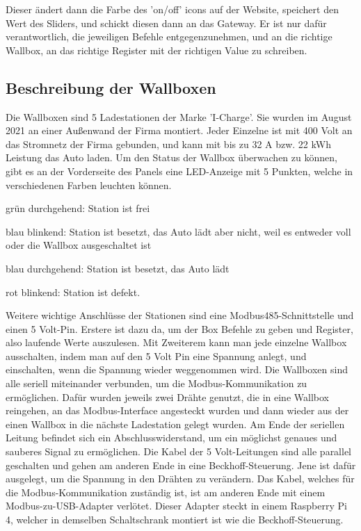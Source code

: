 Dieser ändert dann die Farbe des 'on/off' icons auf der Website, speichert den Wert des Sliders, und schickt diesen dann an das Gateway. Er ist nur dafür verantwortlich, die jeweiligen Befehle entgegenzunehmen, und an die richtige Wallbox, an das richtige Register mit der richtigen Value zu schreiben.





\subsection{Beschreibung der Wallboxen} 

Die Wallboxen sind 5 Ladestationen der Marke 'I-Charge'. Sie wurden im August 2021 an einer Außenwand der Firma montiert. Jeder Einzelne ist mit 400 Volt an das Stromnetz der Firma gebunden, und kann mit bis zu 32 A bzw. 22 kWh Leistung das Auto laden. Um den Status der Wallbox überwachen zu können, gibt es an der Vorderseite des Panels eine LED-Anzeige mit 5 Punkten, welche in verschiedenen Farben leuchten können.

\begin{compactitem}
  \item grün durchgehend: Station ist frei
  \item blau blinkend: Station ist besetzt, das Auto lädt aber nicht, weil es entweder voll oder die Wallbox ausgeschaltet ist
  \item blau durchgehend: Station ist besetzt, das Auto lädt
  \item rot blinkend: Station ist defekt.

\end{compactitem}

Weitere wichtige Anschlüsse der Stationen sind eine Modbus485-Schnittstelle und einen 5 Volt-Pin.
Erstere ist dazu da, um der Box Befehle zu geben und Register, also laufende Werte auszulesen. Mit Zweiterem kann man jede einzelne Wallbox ausschalten, indem man auf den 5 Volt Pin eine Spannung anlegt, und einschalten, wenn die Spannung wieder weggenommen wird.
Die Wallboxen sind alle seriell miteinander verbunden, um die Modbus-Kommunikation zu ermöglichen. Dafür wurden jeweils zwei Drähte genutzt, die in eine Wallbox reingehen, an das Modbus-Interface angesteckt wurden und dann wieder aus der einen Wallbox in die nächste Ladestation gelegt wurden. Am Ende der seriellen Leitung befindet sich ein Abschlusswiderstand, um ein möglichst genaues und sauberes Signal zu ermöglichen. Die Kabel der 5 Volt-Leitungen sind alle parallel geschalten und gehen am anderen Ende in eine Beckhoff-Steuerung. Jene ist dafür ausgelegt, um die Spannung in den Drähten zu verändern.
Das Kabel, welches für die Modbus-Kommunikation zuständig ist, ist am anderen Ende mit einem Modbus-zu-USB-Adapter verlötet. Dieser Adapter steckt in einem Raspberry Pi 4, welcher in demselben Schaltschrank montiert ist wie die Beckhoff-Steuerung.


